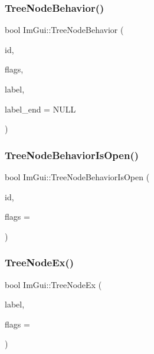 \mbox{\label{namespace_im_gui_a918eabf70d288e93b2519ee1eac2c0b4}} 
\subsubsection{\texorpdfstring{Tree\+Node\+Behavior()}{TreeNodeBehavior()}}
{\footnotesize\ttfamily bool Im\+Gui\+::\+Tree\+Node\+Behavior (\begin{DoxyParamCaption}\item[{\mbox{\hyperlink{imgui_8h_a1785c9b6f4e16406764a85f32582236f}{Im\+Gui\+ID}}}]{id,  }\item[{\mbox{\hyperlink{imgui_8h_a0588fdd10c59b49a0159484fe9ec4564}{Im\+Gui\+Tree\+Node\+Flags}}}]{flags,  }\item[{const char $\ast$}]{label,  }\item[{const char $\ast$}]{label\+\_\+end = {\ttfamily NULL} }\end{DoxyParamCaption})}

\mbox{\label{namespace_im_gui_a22cc50485aad6da8a3a4e156b500ed4a}} 
\subsubsection{\texorpdfstring{Tree\+Node\+Behavior\+Is\+Open()}{TreeNodeBehaviorIsOpen()}}
{\footnotesize\ttfamily bool Im\+Gui\+::\+Tree\+Node\+Behavior\+Is\+Open (\begin{DoxyParamCaption}\item[{\mbox{\hyperlink{imgui_8h_a1785c9b6f4e16406764a85f32582236f}{Im\+Gui\+ID}}}]{id,  }\item[{\mbox{\hyperlink{imgui_8h_a0588fdd10c59b49a0159484fe9ec4564}{Im\+Gui\+Tree\+Node\+Flags}}}]{flags = {} }\end{DoxyParamCaption})}

\mbox{\label{namespace_im_gui_a21f62e092dac9556a15a8edee2f70522}} 
\subsubsection{\texorpdfstring{Tree\+Node\+Ex()}{TreeNodeEx()}\hspace{0.1cm}{\footnotesize\ttfamily [1/3]}}
{\footnotesize\ttfamily bool Im\+Gui\+::\+Tree\+Node\+Ex (\begin{DoxyParamCaption}\item[{const char $\ast$}]{label,  }\item[{\mbox{\hyperlink{imgui_8h_a0588fdd10c59b49a0159484fe9ec4564}{Im\+Gui\+Tree\+Node\+Flags}}}]{flags = {} }\end{DoxyParamCaption})}

